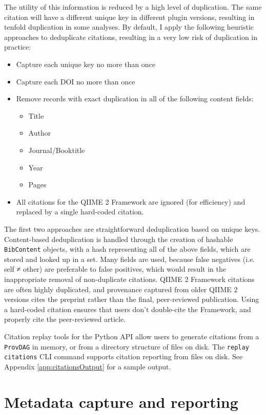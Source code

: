 The utility of this information is reduced by a high level of duplication. The
same citation will have a different unique key in different plugin versions,
resulting in tenfold duplication in some analyses. By default, I apply the
following heuristic approaches to deduplicate citations, resulting in a very low
risk of duplication in practice:

\begin{itemize}
\item Capture each unique key no more than once
\item Capture each DOI no more than once
\item Remove records with exact duplication in all of the following content fields:
    \begin{itemize}
    \item Title
    \item Author
    \item Journal/Booktitle
    \item Year
    \item Pages
    \end{itemize}
\item All citations for the QIIME 2 Framework are ignored (for efficiency) and
    replaced by a single hard-coded citation.
\end{itemize}

The first two approaches are straightforward deduplication based on unique keys.
Content-based deduplication is handled through the creation of hashable
\texttt{BibContent} objects, with a hash representing all of the above fields, which are
stored and looked up in a set. Many fields are used, because false negatives
(i.e. self ≠ other) are preferable to false positives, which would result in
the inappropriate removal of non-duplicate citations.  QIIME 2 Framework
citations are often highly duplicated, and provenance captured from older
QIIME 2 versions cites the preprint rather than the final, peer-reviewed
publication. Using a hard-coded citation ensures that users don’t double-cite
the Framework, and properly cite the peer-reviewed article.

Citation replay tools for the Python API allow users to generate citations from
a \texttt{ProvDAG} in memory, or from a directory structure of files on disk.
The \texttt{replay citations} CLI command supports citation reporting from files
on disk. See Appendix \ref{app:citationsOutput} for a sample output.


\section{Metadata capture and reporting}

